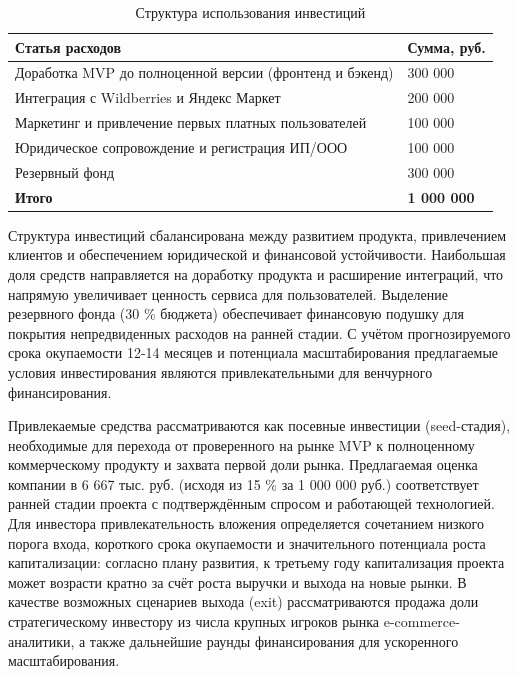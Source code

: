 \begin{table}[H]
\caption{Структура использования инвестиций}
\label{tab:investments}
\begin{center}
\vspace{-0.5cm}\begin{tabular}{|p{13cm}|p{2.5cm}|}
\hline
Статья расходов & Сумма, руб. \\ \hline
Доработка MVP до полноценной версии (фронтенд и бэкенд) & 300 000 \\ \hline
Интеграция с Wildberries и Яндекс Маркет & 200 000 \\ \hline
Маркетинг и привлечение первых платных пользователей & 100 000 \\ \hline
Юридическое сопровождение и регистрация ИП/ООО & 100 000 \\ \hline
Резервный фонд & 300 000 \\ \hline
\textbf{Итого} & \textbf{1 000 000} \\ \hline
\end{tabular}
\end{center}
\end{table}

Структура инвестиций сбалансирована между развитием продукта, привлечением клиентов и обеспечением юридической и финансовой устойчивости. Наибольшая доля средств направляется на доработку продукта и расширение интеграций, что напрямую увеличивает ценность сервиса для пользователей. Выделение резервного фонда (30 \% бюджета) обеспечивает финансовую подушку для покрытия непредвиденных расходов на ранней стадии. С учётом прогнозируемого срока окупаемости 12-14 месяцев и потенциала масштабирования предлагаемые условия инвестирования являются привлекательными для венчурного финансирования.

Привлекаемые средства рассматриваются как посевные инвестиции (seed-стадия), необходимые для перехода от проверенного на рынке MVP к полноценному коммерческому продукту и захвата первой доли рынка. Предлагаемая оценка компании в 6 667 тыс. руб. (исходя из 15 \% за 1 000 000 руб.) соответствует ранней стадии проекта с подтверждённым спросом и работающей технологией. Для инвестора привлекательность вложения определяется сочетанием низкого порога входа, короткого срока окупаемости и значительного потенциала роста капитализации: согласно плану развития, к третьему году капитализация проекта может возрасти кратно за счёт роста выручки и выхода на новые рынки. В качестве возможных сценариев выхода (exit) рассматриваются продажа доли стратегическому инвестору из числа крупных игроков рынка e-commerce-аналитики, а также дальнейшие раунды финансирования для ускоренного масштабирования.

